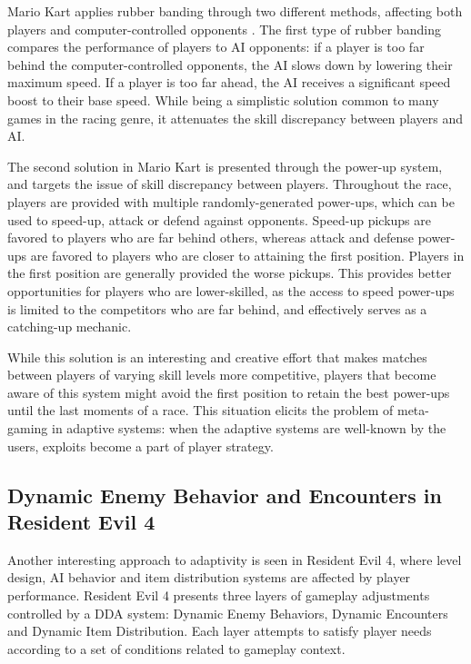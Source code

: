 \documentclass[cic,tc,english]{iiufrgs}
\begin{document}
Mario Kart applies rubber banding through two different methods, affecting both players and computer-controlled opponents \cite{website_rubberbandingmariokart}. The first type of rubber banding compares the performance of players to AI opponents: if a player is too far behind the computer-controlled opponents, the AI slows down by lowering their maximum speed. If a player is too far ahead, the AI receives a significant speed boost to their base speed. While being a simplistic solution common to many games in the racing genre, it attenuates the skill discrepancy between players and AI. 

The second solution in Mario Kart is presented through the power-up system, and targets the issue of skill discrepancy between players. Throughout the race, players are provided with multiple randomly-generated power-ups, which can be used to speed-up, attack or defend against opponents. Speed-up pickups are favored to players who are far behind others, whereas attack and defense power-ups are favored to players who are closer to attaining the first position. Players in the first position are generally provided the worse pickups. This provides better opportunities for players who are lower-skilled, as the access to speed power-ups is limited to the competitors who are far behind, and effectively serves as a catching-up mechanic.

While this solution is an interesting and creative effort that makes matches between players of varying skill levels more competitive, players that become aware of this system might avoid the first position to retain the best power-ups until the last moments of a race. This situation elicits the problem of meta-gaming in adaptive systems: when the adaptive systems are well-known by the users, exploits become a part of player strategy.

\subsection{Dynamic Enemy Behavior and Encounters in Resident Evil 4}

Another interesting approach to adaptivity is seen in Resident Evil 4, where level design, AI behavior and item distribution systems are affected by player performance. Resident Evil 4 presents three layers of gameplay adjustments controlled by a DDA system: Dynamic Enemy Behaviors, Dynamic Encounters and Dynamic Item Distribution. Each layer attempts to satisfy player needs according to a set of conditions related to gameplay context.
\end{document}
